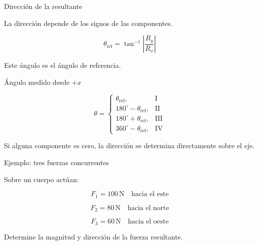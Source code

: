 \documentclass[aspectratio=169,11pt]{beamer}
\begin{document}
\begin{frame}{Dirección de la resultante}

La dirección depende de los
signos de las componentes.

\[
\theta_{\mathrm{ref}}=
\tan^{-1}\left|
\frac{R_y}{R_x}
\right|
\]

Este ángulo es el ángulo
de referencia.

\begin{block}{Ángulo medido desde \(+x\)}

\[
\theta=
\begin{cases}
\theta_{\mathrm{ref}}, & \mathrm{I}\\
180^\circ-\theta_{\mathrm{ref}}, & \mathrm{II}\\
180^\circ+\theta_{\mathrm{ref}}, & \mathrm{III}\\
360^\circ-\theta_{\mathrm{ref}}, & \mathrm{IV}
\end{cases}
\]

\end{block}

Si alguna componente es cero,
la dirección se determina
directamente sobre el eje.

\end{frame}

\begin{frame}{Ejemplo: tres fuerzas concurrentes}

Sobre un cuerpo actúan:

\[
F_1=100\,\mathrm{N}
\quad\text{hacia el este}
\]

\[
F_2=80\,\mathrm{N}
\quad\text{hacia el norte}
\]

\[
F_3=60\,\mathrm{N}
\quad\text{hacia el oeste}
\]

Determine la magnitud y dirección
de la fuerza resultante.

\begin{center}
\end{center}

\end{frame}
\end{document}
